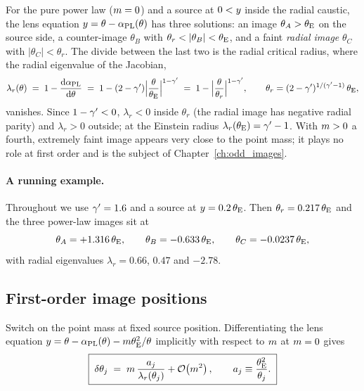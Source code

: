 For the pure power law ($m=0$) and a source at $0<y$ inside the
radial caustic, the lens equation $y=\theta-\alpha_{\rm PL}(\theta)$
has three solutions: an image $\theta_A>\theta_{\mathrm{E}}$ on the source side, a
counter-image $\theta_B$ with $\theta_r<|\theta_B|<\thetaE$, and a faint
\emph{radial image} $\theta_C$ with $|\theta_C|<\theta_r$. The divide
between the last two is the radial critical radius, where the radial
eigenvalue of the Jacobian,
\begin{equation}
    \lambda_r(\theta) \;=\; 1-\frac{\mathrm{d} \alpha_{\rm PL}}{\mathrm{d} \theta}
    \;=\; 1-(2-\gamma')\Bigl|\frac{\theta}{\theta_{\mathrm{E}}}\Bigr|^{1-\gamma'}
    \;=\; 1-\Bigl|\frac{\theta}{\theta_r}\Bigr|^{1-\gamma'},
    \qquad
    \theta_r=(2-\gamma')^{1/(\gamma'-1)}\,\theta_{\mathrm{E}} ,
    \label{eq:pe_lambda_r}
\end{equation}
vanishes. Since $1-\gamma'<0$, $\lambda_r<0$ inside $\theta_r$ (the radial
image has negative radial parity) and $\lambda_r>0$ outside; at the
Einstein radius $\lambda_r(\theta_{\mathrm{E}})=\gamma'-1$. With $m>0$ a fourth,
extremely faint image appears very close to the point mass; it plays no
role at first order and is the subject of Chapter~\ref{ch:odd_images}.

\paragraph{A running example.} Throughout we use $\gamma'=1.6$ and a source
at $y=0.2\,\theta_{\mathrm{E}}$. Then $\theta_r=0.217\,\theta_{\mathrm{E}}$ and the three
power-law images sit at
\[
    \theta_A=+1.316\,\theta_{\mathrm{E}},\qquad
    \theta_B=-0.633\,\theta_{\mathrm{E}},\qquad
    \theta_C=-0.0237\,\theta_{\mathrm{E}} ,
\]
with radial eigenvalues $\lambda_r=0.66$, $0.47$ and $-2.78$.

\subsection{First-order image positions}
\label{sec:pe_image_shift}

Switch on the point mass at fixed source position. Differentiating the
lens equation $y=\theta-\alpha_{\rm PL}(\theta)-m\theta_{\mathrm{E}}^2/\theta$
implicitly with respect to $m$ at $m=0$ gives
\begin{equation}
    \boxed{\;
    \delta\theta_j \;=\; m\,\frac{a_j}{\lambda_r(\theta_j)}
    +\mathcal{O}\!\left(m^2\right),
    \qquad a_j\equiv\frac{\theta_{\mathrm{E}}^2}{\theta_j}.\;}
    \label{eq:pe_image_shift}
\end{equation}


